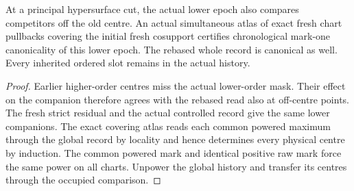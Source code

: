 \begin{theorem}
\label{hir:g8-occupied-principal-atlas-restart}
\leanok
At a principal hypersurface cut, the actual lower epoch also
compares competitors off the old centre. An actual simultaneous
atlas of exact fresh chart pullbacks covering the initial fresh
cosupport certifies chronological mark-one canonicality of this
lower epoch. The rebased whole record is canonical as well.
Every inherited ordered slot remains in the actual history.
\end{theorem}
\begin{proof}
Earlier higher-order centres miss the actual lower-order mask.
Their effect on the companion therefore agrees with the rebased
read also at off-centre points. The fresh strict residual and
the actual controlled record give the same lower companions.
The exact covering atlas reads each common powered maximum
through the global record by locality and hence determines every
physical centre by induction. The common powered mark and
identical positive raw mark force the same power on all charts.
Unpower the global history and transfer its centres through the
occupied comparison.
\end{proof}

